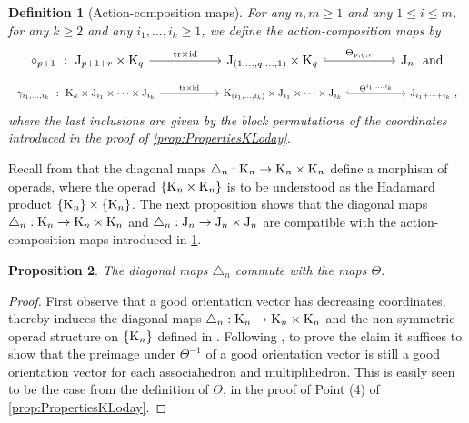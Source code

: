 \documentclass[twoside, 12pt]{amsart}
\newtheorem{definition}{Definition}[section]
\newtheorem{proposition}[definition]{Proposition}
\theoremstyle{remark}
\begin{document}
\begin{definition}[Action-composition maps] \label{def:action-composition}
For any $n,m\geq 1$ and any $1\leq i \leq m$, for any $k\geq 2$ and any $i_1,\ldots,i_k \geq 1$, we define the \emph{action-composition maps}  by 
\[
\vcenter{\hbox{
\begin{tikzcd}[column sep=1cm]
\circ_{p+1}\ : \ \J_{p+1+r}\times \K_q
\arrow[rr,  "\tr\times \id"]
& & 
\J_{(1,\ldots,q,\ldots,1)}\times \K_q 
\arrow[rr,hookrightarrow, "\Theta_{p,q,r}"]
&  &
\J_{n}\ \ \text{and}
\end{tikzcd}
}}
\]
\[
\vcenter{\hbox{
\begin{tikzcd}[column sep=1cm]
\gamma_{i_1,\ldots,i_k}\ : \ \K_{k}\times \J_{i_1} \times \cdots \times \J_{i_k}
\arrow[rr,  "\tr\times \id"]
& &
\K_{(i_1,\ldots,i_k)} \times \J_{i_1} \times \cdots \times \J_{i_k} 
\arrow[rr,hookrightarrow, "\Theta^{i_1, \ldots , i_k}"]
& &
\J_{i_1+\cdots + i_k}\ , 
\end{tikzcd}
}}
\]
where the last inclusions are given by the block permutations of the coordinates introduced in the proof of \cref{prop:PropertiesKLoday}. 
\end{definition}

Recall from \cite[Theorem 1]{MTTV19} that the diagonal maps $\triangle_n : \mathrm{K}_n \to \mathrm{K}_n \times \mathrm{K}_n$ define a morphism of operads, where the operad $\{ \mathrm{K}_n \times \mathrm{K}_n \}$ is to be understood as the Hadamard product $\{ \mathrm{K}_n \} \times \{ \mathrm{K}_n \}$.
The next proposition shows that the diagonal maps $\triangle_n : \mathrm{K}_n \to \mathrm{K}_n \times \mathrm{K}_n$ and $\triangle_n : \mathrm{J}_n \to \mathrm{J}_n \times \mathrm{J}_n$ are compatible with the action-composition maps introduced in \cref{def:action-composition}.

\begin{proposition} 
\label{prop:thetacommutes}
The diagonal maps $\triangle_n$ commute with the maps $\Theta$.  
\end{proposition}

\begin{proof}
First observe that a good orientation vector has decreasing coordinates, thereby induces the diagonal maps $\triangle_n : \mathrm{K}_n \to \mathrm{K}_n \times \mathrm{K}_n$ and the non-symmetric operad structure on $\{\mathrm{K}_n\}$ defined in \cite{MTTV19}. 
Following \cite[Proposition 4.14]{LA21}, to prove the claim it suffices to show that the preimage under $\Theta^{-1}$ of a good orientation vector is still a good orientation vector for each associahedron and multiplihedron. 
This is easily seen to be the case from the definition of $\Theta$, in the proof of Point (4) of \cref{prop:PropertiesKLoday}. 
\end{proof}
\end{document}
